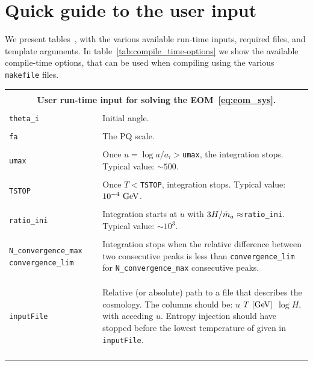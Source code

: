 \documentclass[11pt,a4paper]{article}
\begin{document}
\section{Quick guide to the user input}\label{app:usr_input}
\setcounter{equation}{0}
We present tables~, with the various available run-time inputs, required files, and template arguments. In table~\ref{tab:compile_time-options} we show the available compile-time options, that can be used when compiling using the various {\tt makefile} files. 
%
\begin{table}[h!]
	\centering
	\begin{tabular}{l l}
		\hline\\[-0.4cm]
		\multicolumn{2}{c}{\bf User run-time input for solving the EOM~\ref{eq:eom_sys}.}  \\
		\hline\\[-0.4cm]

		{\tt theta\_i} & Initial angle.  \\
		\hline\\[-0.4cm]

		{\tt fa} & The PQ scale.\\
		\hline\\[-0.4cm]

		{\tt umax } & Once $u=\log a/a_i>${\tt umax}, the integration stops. Typical value: $\sim 500$.\\
		\hline\\[-0.4cm]

		{\tt TSTOP} & Once $T<${\tt TSTOP}, integration stops. Typical value: $10^{-4}~{\rm GeV}$.\\
		\hline\\[-0.4cm]

 		{\tt ratio\_ini}& Integration starts at $u$ with $3H/\tilde m_{a}{} \approx${\tt ratio\_ini}. Typical value: $\sim 10^{3}$.\\
		\hline\\[-0.4cm]

		\multirow{1}{4cm}{{\tt N\_convergence\_max} {\tt convergence\_lim}} & \multirow{1}{12cm}{Integration stops when  the relative difference 
		between two consecutive peaks  is less than {\tt convergence\_lim} for {\tt N\_convergence\_max} 
		consecutive peaks. } \\ \\ \\ 
		\hline\\[-0.4cm]

		{\tt inputFile} & \multirow{1}{12cm}{Relative (or absolute) path to a file that describes the cosmology. The columns should be: $u$ $T ~[{\rm GeV}]$ $\log H$, with acceding $u$. Entropy injection should have stopped before the lowest temperature of given in {\tt inputFile}.} \\ \\  \\ \\
		\hline\\[-0.4cm]


\end{tabular}
\end{table}
\end{document}
